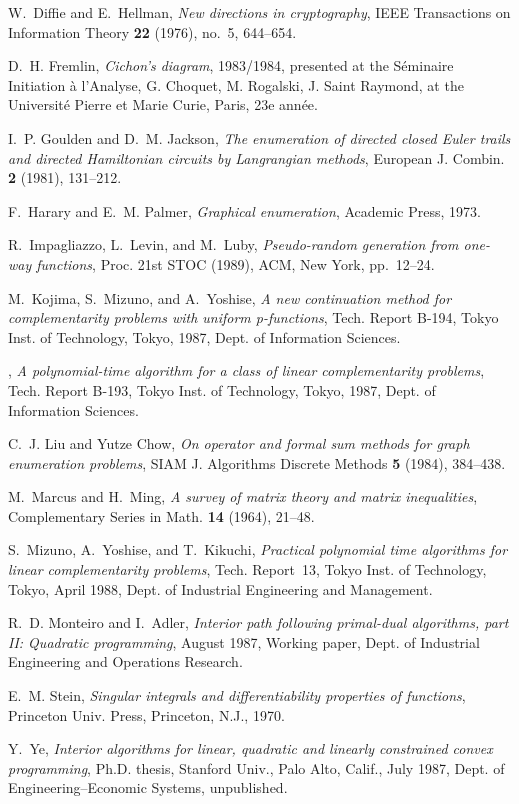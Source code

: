 \documentclass[draft]{amsart}
\theoremstyle{definition}
\theoremstyle{remark}
\begin{document}
\newpage
\setlength{\marginrulewidth}{0pt}

\begin{thebibliography}{10}

W.~Diffie and E.~Hellman, {\em New directions in cryptography}, IEEE
  Transactions on Information Theory {\bf 22} (1976), no.~5, 644--654.

D.~H. Fremlin, {\em Cichon's diagram}, 1983/1984, presented at the
  S{\'e}minaire Initiation {\`a} l'Analyse, G. Choquet, M. Rogalski, J. Saint
  Raymond, at the Universit{\'e} Pierre et Marie Curie, Paris, 23e ann{\'e}e.

I.~P. Goulden and D.~M. Jackson, {\em The enumeration of directed closed
  {E}uler trails and directed {H}amiltonian circuits by {L}angrangian methods},
  European J. Combin. {\bf 2} (1981), 131--212.

F.~Harary and E.~M. Palmer, {\em Graphical enumeration}, Academic Press, 1973.

R.~Impagliazzo, L.~Levin, and M.~Luby, {\em Pseudo-random generation from
  one-way functions}, Proc. 21st STOC (1989), ACM, New York, pp.~12--24.

M.~Kojima, S.~Mizuno, and A.~Yoshise, {\em A new continuation method for
  complementarity problems with uniform p-functions}, Tech. Report B-194, Tokyo
  Inst. of Technology, Tokyo, 1987, Dept. of Information Sciences.

\bysame, {\em A polynomial-time algorithm for a class of linear complementarity
  problems}, Tech. Report B-193, Tokyo Inst. of Technology, Tokyo, 1987, Dept.
  of Information Sciences.

C.~J. Liu and Yutze Chow, {\em On operator and formal sum methods for graph
  enumeration problems}, SIAM J. Algorithms Discrete Methods {\bf 5} (1984),
  384--438.

M.~Marcus and H.~Ming, {\em A survey of matrix theory and matrix inequalities},
  Complementary Series in Math. {\bf 14} (1964), 21--48.

S.~Mizuno, A.~Yoshise, and T.~Kikuchi, {\em Practical polynomial time
  algorithms for linear complementarity problems}, Tech. Report~13, Tokyo Inst.
  of Technology, Tokyo, April 1988, Dept. of Industrial Engineering and
  Management.

R.~D. Monteiro and I.~Adler, {\em Interior path following primal-dual
  algorithms, part {II}: Quadratic programming}, August 1987, Working paper,
  Dept. of Industrial Engineering and Operations Research.

E.~M. Stein, {\em Singular integrals and differentiability properties of
  functions}, Princeton Univ. Press, Princeton, N.J., 1970.

Y.~Ye, {\em Interior algorithms for linear, quadratic and linearly constrained
  convex programming}, Ph.D. thesis, Stanford Univ., Palo Alto, Calif., July
  1987, Dept. of Engineering--Economic Systems, unpublished.

\end{thebibliography}
\end{document}
